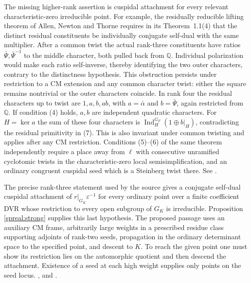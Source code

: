 The missing higher-rank assertion is cuspidal attachment for every
relevant characteristic-zero irreducible point. For example, the
residually reducible lifting theorem of Allen, Newton and Thorne
requires in its Theorem~1.1(4) that the distinct residual constituents
be individually conjugate self-dual with the same multiplier.
After a common twist the actual rank-three constituents have ratios
\(\bar\Psi,\bar\Psi^{-1}\) to the middle character, both pulled back
from \(\mathbb Q\). Individual polarization would make each ratio
self-inverse, thereby identifying the two outer characters, contrary
to the distinctness hypothesis. This obstruction persists under
restriction to a CM extension and any common character twist:
either the square remains nontrivial or the outer characters coincide.
In rank four the residual characters up to twist are
\(1,a,b,ab\), with \(a=\bar\alpha\) and \(b=\bar\Psi\), again
restricted from \(\mathbb Q\). If condition (4) holds, \(a,b\)
are independent quadratic characters. For \(H=\ker a\) the sum
of these four characters is \(\operatorname{Ind}_{H}^{G_F}(1\oplus b|_H)\),
contradicting the residual primitivity in (7). This is also invariant
under common twisting and applies after any CM restriction.
Conditions (5)--(6) of the same theorem independently require a place
away from \(\ell\) with consecutive unramified cyclotomic twists in
the characteristic-zero local semisimplification, and an ordinary
congruent cuspidal seed which is a Steinberg twist there.
See \cite[Theorem 1.1]{antLifting}.

The precise rank-three statement used by the source gives a conjugate
self-dual cuspidal attachment of \(r|_{G_K}\varepsilon^{-1}\) for
every ordinary point over a finite coefficient DVR whose restriction
to every open subgroup of \(G_K\) is irreducible. Proposition
\ref{spreal:strong} supplies this last hypothesis. The proposed passage
uses an auxiliary CM frame, arbitrarily large weights in a prescribed
residue class supporting adjoints of rank-two seeds, propagation in the
ordinary determinant space to the specified point, and descent to
\(K\). To reach the given point one must show its restriction lies
on the automorphic quotient and then descend the attachment. Existence
of a seed at each high weight supplies only points on the seed locus.
,
and .

